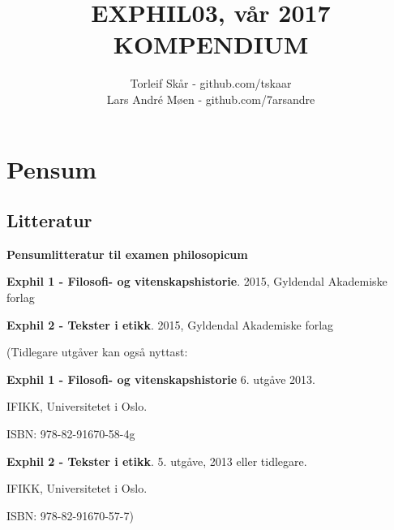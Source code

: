 \documentclass[a4paper]{IEEEtran}
\title{\bigskip EXPHIL03, vår 2017 \\[1cm] KOMPENDIUM \\[5cm]}
\author{Torleif Skår - github.com/tskaar\\Lars André Møen - github.com/7arsandre }
\begin{document}
\maketitle
\onecolumn
\tableofcontents
\clearpage
\twocolumn
\onecolumn

\section{Pensum}
\subsection{Litteratur}
    \begin{center}
        \textbf{Pensumlitteratur til examen philosopicum}\bigskip    
    \end{center}
    
    
    \textbf{Exphil 1 - Filosofi- og vitenskapshistorie}. 2015, Gyldendal Akademiske forlag\bigskip
 
    
    \textbf{Exphil 2 - Tekster i etikk}. 2015, Gyldendal Akademiske forlag\bigskip

    
    (Tidlegare utgåver kan også nyttast: \bigskip
    
    \textbf{Exphil 1 - Filosofi- og vitenskapshistorie} 6. utgåve 2013.
    
     IFIKK, Universitetet i Oslo.
     
     ISBN: 978-82-91670-58-4g\bigskip

    
    \textbf{Exphil 2 - Tekster i etikk}. 5. utgåve, 2013 eller tidlegare.
    
     IFIKK, Universitetet i Oslo.
     
     ISBN: 978-82-91670-57-7)
    
\end{document}
